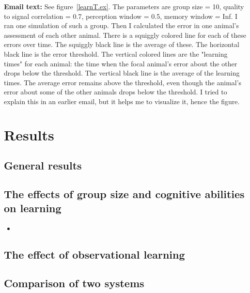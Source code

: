 \textbf{Email text: } See figure~\ref{learnT.ex}. The parameters are group size = 10, quality to signal correlation = 0.7, perception window = 0.5, memory window = Inf. I ran one simulation of such a group. Then I calculated the error in one animal's assessment of each other animal. There is a squiggly colored line for each of these errors over time. The squiggly black line is the average of these. The horizontal black line is the error threshold. The vertical colored lines are the "learning times" for each animal: the time when the focal animal's error about the other drops below the threshold. The vertical black line is the average of the learning times. The average error remains above the threshold, even though the animal's error about some of the other animals drops below the threshold. I tried to explain this in an earlier email, but it helps me to visualize it, hence the figure.




\section*{Results}
%
\subsection*{General results}

%
\subsection*{The effects of group size and cognitive abilities on learning}
\begin{itemize}

\item 
\end{itemize}
%
\subsection*{The effect of observational learning}
%
\subsection*{Comparison of two systems}
%

